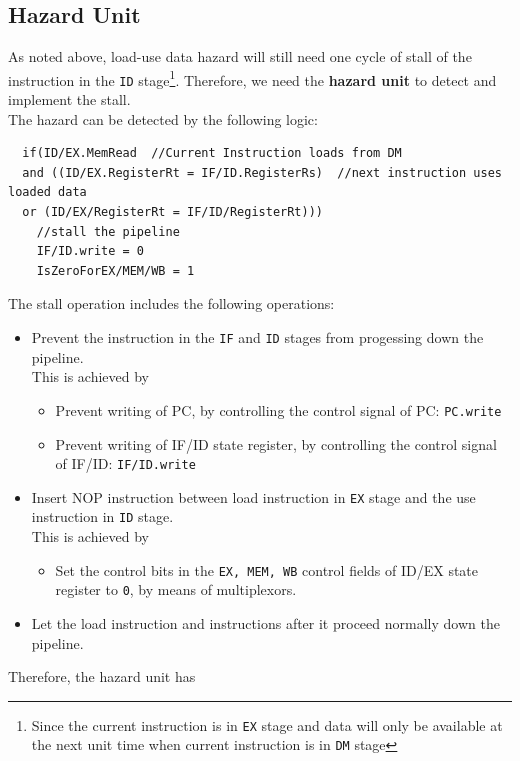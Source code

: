 \documentclass[12pt]{article}
\theoremstyle{definition}
\begin{document}
\subsection{Hazard Unit}
As noted above, load-use data hazard will still need one cycle of stall of the instruction in the \texttt{ID} stage\footnote{Since the current instruction is in \texttt{EX} stage and data will only be available at the next unit time when current instruction is in \texttt{DM} stage}. Therefore, we need the \textbf{hazard unit} to detect and implement the stall.\\
The hazard can be detected by the following logic:
\begin{verbatim}
  if(ID/EX.MemRead  //Current Instruction loads from DM
  and ((ID/EX.RegisterRt = IF/ID.RegisterRs)  //next instruction uses loaded data
  or (ID/EX/RegisterRt = IF/ID/RegisterRt)))
    //stall the pipeline
    IF/ID.write = 0
    IsZeroForEX/MEM/WB = 1
\end{verbatim}
The stall operation includes the following operations:
\begin{itemize}
  \item Prevent the instruction in the \texttt{IF} and \texttt{ID} stages from progessing down the pipeline.\\
  This is achieved by 
  \begin{itemize}
    \item Prevent writing of PC, by controlling the control signal of PC: \texttt{PC.write}
    \item Prevent writing of IF/ID state register, by controlling the control signal of IF/ID: \texttt{IF/ID.write}
  \end{itemize}
  \item Insert NOP instruction between load instruction in \texttt{EX} stage and the use instruction in \texttt{ID} stage.\\This is achieved by
  \begin{itemize}
    \item Set the control bits in the \texttt{EX, MEM, WB} control fields of ID/EX state register to \texttt{0}, by means of multiplexors.
  \end{itemize}
  \item Let the load instruction and instructions after it proceed normally down the pipeline.
\end{itemize}
Therefore, the hazard unit has
\end{document}
